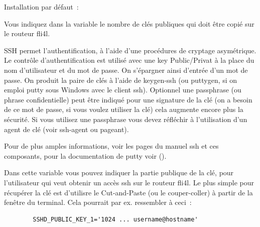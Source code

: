 \begin{description}

  Installation par défaut~: 

  Vous indiquez dans la variable  le nombre de clés
  publiques qui doit être copié sur le routeur fli4l. 

  SSH permet l'authentification, à l'aide d'une procédures de cryptage asymétrique.
  Le contrôle d'authentification est utilisé avec une key Public/Privat à la
  place du nom d'utilisateur et du mot de passe. On s'épargner ainsi d'entrée
  d'un mot de passe. On produit la paire de clés à l'aide de keygen-ssh
  (ou puttygen, si on emploi putty sous Windows avec le client ssh). Optionnel
  une passphrase (ou phrase confidentielle) peut être indiqué pour une signature
  de la clé (on a besoin de ce mot de passe, si vous voulez utiliser la clé)
  cela augmente encore plus la sécurité. Si vous utilisez une passphrase vous
  devez réfléchir à l'utilisation d'un agent de clé (voir ssh-agent ou pageant).


  Pour de plus amples informations, voir les pages du manuel ssh et ces composants,
  pour la documentation de putty voir
  ().


  Dans cette variable vous pouvez indiquer la partie publique de la clé,
  pour l'utilisateur qui veut obtenir un accès ssh sur le routeur fli4l. Le
  plus simple pour récupérer la clé est d'utilisre le Cut-and-Paste (ou le
  couper-coller) à partir de la fenêtre du terminal. Cela pourrait par ex.
  ressembler à ceci~:

\begin{example}
\begin{verbatim}
        SSHD_PUBLIC_KEY_1='1024 ... username@hostname'
\end{verbatim}
\end{example}


\end{description}
